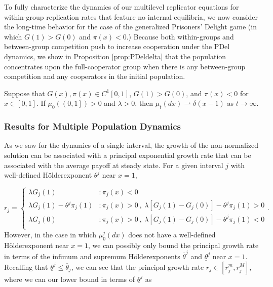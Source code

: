 \documentclass[11pt]{article}
\numberwithin{equation}{section}
\newcommand{\ol}{\overline}
\newcommand{\myindent}{\hspace{10mm}}
\newcommand{\holder}{H{\"o}lder\:}
\begin{document}
{%

\myindent To fully characterize the dynamics of our multilevel replicator equations for within-group replication rates that feature no internal equilibria, we now consider the long-time behavior for the case of the generalized Prisoners' Delight game (in which $G(1) > G(0)$ and $\pi(x) < 0$.) Because both within-groups and between-group competition push to increase cooperation under the PDel dynamics, we show in Proposition \ref{prop:PDeldelta} that the population concentrates upon the full-cooperator group when there is any between-group competition and any cooperators in the initial population.

\begin{proposition} \label{prop:PDeldelta}
Suppose that $G(x), \pi(x) \in C^1\left[0,1 \right]$, $G(1) > G(0)$, and $\pi(x) < 0$ for $x \in [0,1]$. If $\mu_0\left(\left(0,1\right]\right) > 0$ and $\lambda > 0$, then $\ol{\mu}_t(dx) \rightharpoonup \delta(x-1)$ as $t \to \infty$.
\end{proposition}

\subsubsection{Results for Multiple Population Dynamics}
\label{sec:multiplepopulationsresults}


\myindent  As we saw for the dynamics of a single interval, the growth of the non-normalized solution can be associated with a principal exponential growth rate that can be associated with the average payoff at steady state. For a given interval $j$ with well-defined \holder exponent $\theta^j$ near $x=1$, 
 
  \begin{equation} \label{eq:rjwelldefined}
   r_j  = \left\{
     \begin{array}{cl}
       \lambda G_j(1) & : \pi_j(x) < 0\\
       \lambda G_j(1) - \theta^j \pi_j(1) & : \pi_j(x) > 0\: , \: \lambda \left[ G_j(1) - G_j(0) \right] - \theta^j \pi_j(1) > 0 \\ 
       \lambda G_j(0) & : \pi_j(x) > 0 \: , \: \lambda \left[ G_j(1) - G_j(0) \right] - \theta^j \pi_j(1) < 0 \\ 
     \end{array}
   \right. .
\end{equation}
However, in the case in which $\mu^j_0(dx)$ does not have a well-defined \holder exponent near $x=1$, we can possibly only bound the principal growth rate in terms of the infimum and supremum \holder exponents $\overline{\theta}^j$ and $\underline{\theta}^j$ near $x=1$. Recalling that $\underline{\theta}^j \leq \overline{\theta}_j$, we can see that the principal growth rate $r_j \in [r_j^m,r_j^M]$, where we can our lower bound in terms of $\underline{\theta}^j$ as 

}
\end{document}
